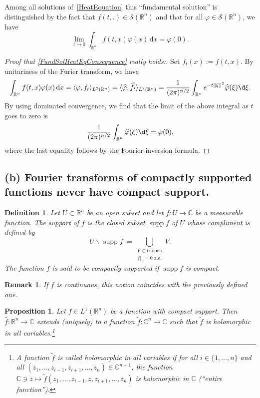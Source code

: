\documentclass[12pt, oneside, a4paper]{article}
\newtheorem{prop}[thm]{Proposition}
\def\supp{\operatorname{supp}}
\theoremstyle{dfn}
\newtheorem{dfn}[thm]{Definition}
\newtheorem{rem}[thm]{Remark}
\newcommand{\scalprod}[2]{\langle #1,#2 \rangle}
\def \S {\ensuremath{\mathcal{S}}}
\def \S {\ensuremath{\mathcal{S}}}
\def\Rbb{\ensuremath{\mathbb{R}}}
\def\dx{\,\mathrm dx}
\providecommand{\norm}[1]{\lVert#1\rVert}
\newcommand{\Com}{\mathbb{C}}
\begin{document}
Among all solutions of~\eqref{HeatEquation} this ``fundamental solution'' is distinguished by the fact that $f(t,.) \in \S(\Rbb^n)$ and that for all $\varphi \in \S(\Rbb^n)$, we have
\begin{equation}\label{FundSolHeatEqConsequence}
\lim_{t \to 0} \int_{\Rbb^n} f(t,x) \varphi(x) \dx = \varphi(0).
\end{equation}

\begin{proof}[Proof that \eqref{FundSolHeatEqConsequence} really holds:]
Set $f_t(x) := f(t,x)$. By unitariness of the Furier transform, we have
\[
\int_{\Rbb^n} f(t,x) \varphi(x) \dx
= \scalprod{\varphi}{f_t}_{L^2(\Rbb^n)}
= \scalprod{\widehat{\varphi}}{\widehat{f}_t}_{L^2(\Rbb^n)}
= \frac{1}{(2\pi)^{n/2}} \int_{\Rbb^n} e^{-t\norm{\xi}^2} \widehat{\varphi}(\xi) \d\xi.
\]
By using dominated convergence, we find that the limit of the above integral as $t$ goes to zero is
\[
\frac{1}{(2\pi)^{n/2}} \int_{\Rbb^n} \widehat{\varphi} (\xi) \d\xi = \varphi(0),
\]
where the last equality follows by the Fourier inversion formula.
\end{proof}

\subsection*{(b) Fourier transforms of compactly supported functions never have compact support.}

\begin{dfn}
Let $U \subset \Rbb^n$ be an open subset and let $f \colon U \to \Com$ be a measurable function. The support of $f$ is the closed subset $\supp f$ of $U$ whose compliment is defined by%
\[
U \smallsetminus \supp f := \bigcup_{\substack{\text{$V \subset U$ open} \\ \text{$f|_V = 0$ a.e.}}} V.
\]
The function $f$ is said to be compactly supported if $\supp f$ is compact.
\end{dfn}

\begin{rem}
If $f$ is continuous, this notion coincides with the previously defined one.
\end{rem}

\begin{prop}\label{Prop:FourierLaplaceTransform}
Let $f \in L^1(\Rbb^n)$ be a function with compact support. Then $\widehat{f}\colon \Rbb^n \to \Com$ extends (uniquely) to a function $\widetilde{f} \colon \Com^n \to \Com$ such that $\widetilde{f}$ is holomorphic in all variables.\footnote{A function $\widetilde{f}$ is called holomorphic in all variables if for all $i \in \{1,\dots,n\}$ and all $(z_1,\dots,z_{i-1},z_{i+1},\dots,z_n) \in \Com^{n-1}$, the function $\Com \ni z \mapsto \widetilde{f}(z_1,\dots,z_{i-1},z,z_{i+1},\dots,z_n)$ is holomorphic in $\Com$ (``entire function'').}
\end{prop}
\end{document}
